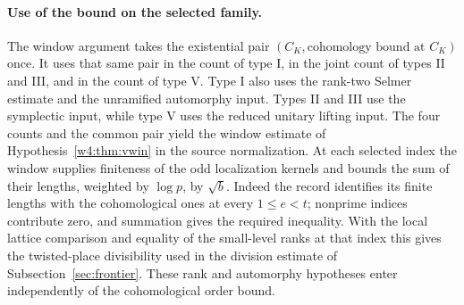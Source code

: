 \paragraph{Use of the bound on the selected family.}\label{kone:consumer}
The window argument takes the existential pair $(C_K,\text{cohomology
bound at }C_K)$ once. It uses that same pair in the count of type I,
in the joint count of types II and III, and in the count of type V.
Type I also uses the rank-two Selmer estimate and the unramified
automorphy input. Types II and III use the symplectic input, while
type V uses the reduced unitary lifting input. The four counts and
the common pair yield the window estimate of
Hypothesis~\ref{w4:thm:vwin} in the source normalization.
At each selected index the window supplies finiteness of the odd
localization kernels and bounds the sum of their lengths, weighted by
$\log p$, by $\sqrt b$. Indeed the record identifies its finite
lengths with the cohomological ones at every $1\le e<t$; nonprime
indices contribute zero, and summation gives the required inequality.
With the local lattice comparison and equality of the small-level
ranks at that index this gives the twisted-place divisibility used
in the division estimate of Subsection~\ref{sec:frontier}.
These rank and automorphy hypotheses enter independently of the
cohomological order bound.
